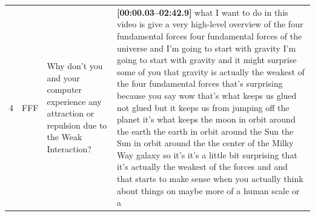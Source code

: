 \documentclass[10pt]{article}
\begin{document}
\begin{tiny}
\begin{longtable}{r p{0.3in} p{1.212in} p{3.8in}}
    4  &          FFF &                                                                                                                                                                              Why don't you and your computer experience any attraction or repulsion due to the Weak Interaction? &                                                                                                                                                                                                                                                                                                                                                                                                                                                                                                                                                                                                                                                                                                                                                                                                                                                                                                                                                                                                                                                                                                                                                                                                                                                                                                                                                                                                                                                                                                                                                                                                                                                                                                                                                                                                                                                                                                                                                                                                                                                                                                                                                                                                                                                                    \textbf{[00:00.03--02:42.9]} what I want to do in this video is give a very high-level overview of the four fundamental forces four fundamental forces of the universe and I'm going to start with gravity I'm going to start with gravity and it might surprise some of you that gravity is actually the weakest of the four fundamental forces that's surprising because you say wow that's what keeps us glued not glued but it keeps us from jumping off the planet it's what keeps the moon in orbit around the earth the earth in orbit around the Sun the Sun in orbit around the the center of the Milky Way galaxy so it's it's a little bit surprising that it's actually the weakest of the forces and and that starts to make sense when you actually think about things on maybe more of a human scale or a 
\end{longtable}
\end{tiny}
\end{document}

